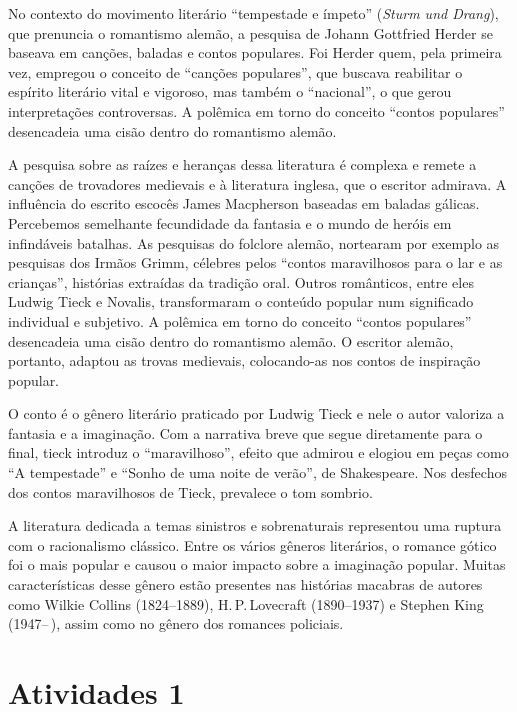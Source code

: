 \documentclass[11pt]{extarticle}
\begin{document}
No contexto do movimento literário “tempestade e ímpeto” (\textit{Sturm und Drang}), que prenuncia o romantismo alemão, a pesquisa de Johann Gottfried Herder se baseava em canções, baladas e contos populares. Foi Herder quem, 
pela primeira vez, empregou o conceito de “canções populares”, que 
buscava reabilitar o espírito literário vital e vigoroso, mas também o “nacional”, 
o que gerou interpretações controversas. A polêmica em torno do conceito “contos populares” 
desencadeia uma cisão dentro do romantismo alemão. 

A pesquisa sobre as raízes e heranças dessa literatura é complexa e remete a canções de trovadores medievais e à literatura inglesa, que o escritor admirava. 
A influência do escrito escocês James Macpherson baseadas em baladas gálicas.
Percebemos semelhante fecundidade da fantasia e o mundo de heróis em infindáveis batalhas.
As pesquisas do folclore alemão, nortearam  por exemplo as pesquisas dos Irmãos Grimm, célebres pelos “contos maravilhosos para o lar e as crianças”, histórias extraídas da tradição oral. 
Outros românticos, entre eles Ludwig Tieck e Novalis, transformaram o conteúdo popular num significado individual e subjetivo. 
A polêmica em torno do conceito “contos populares” desencadeia uma cisão dentro do romantismo alemão. 
O escritor alemão, portanto, adaptou as trovas medievais, colocando-as nos contos de inspiração popular.

O conto é o gênero literário praticado por Ludwig Tieck e nele o autor valoriza a fantasia e a imaginação.
Com a narrativa breve que segue diretamente para o final, tieck introduz o “maravilhoso”, efeito que 
admirou e elogiou em peças como “A tempestade” e “Sonho de uma noite de verão”, de Shakespeare. 
Nos desfechos dos contos maravilhosos de Tieck, prevalece o tom sombrio.

A literatura dedicada a temas sinistros e sobrenaturais representou uma ruptura com o racionalismo clássico. 
Entre os vários gêneros literários, o romance gótico foi o mais popular e causou o maior impacto sobre a imaginação popular. Muitas características desse gênero estão presentes nas histórias macabras de autores como 
Wilkie Collins (1824--1889), H.\,P.\,Lovecraft (1890--1937) e Stephen King (1947--\,), 
assim como no gênero dos romances policiais. 


\section{Atividades 1}
\end{document}
